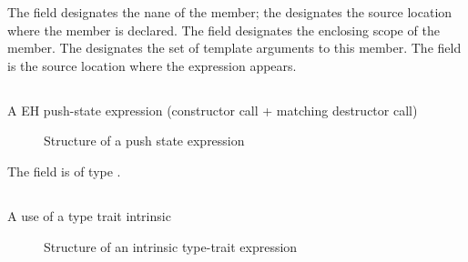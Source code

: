 The  field designates the nane of the member; the  designates the source location where the member is declared.
The  field designates the enclosing scope of the member.  The  designates the set of template arguments to
this member.
The field  is the source location where the expression appears.



\subsection{}
\label{sec:ifc:ExprSort:PushState}
 A EH push-state expression (constructor call + matching destructor call)

%
\begin{figure}[H]
	\centering
	\caption{Structure of a push state expression}
	\label{fig:ifc-push-state-expression-structure}
\end{figure}
%
The  field is of type .



\subsection{}
\label{sec:ifc:ExprSort:TypeTraitIntrinsic}

A use of a type trait intrinsic

%
\begin{figure}[H]
	\centering
	\caption{Structure of an intrinsic type-trait expression}
	\label{fig:ifc-type-trait-expression-structure}
\end{figure}

